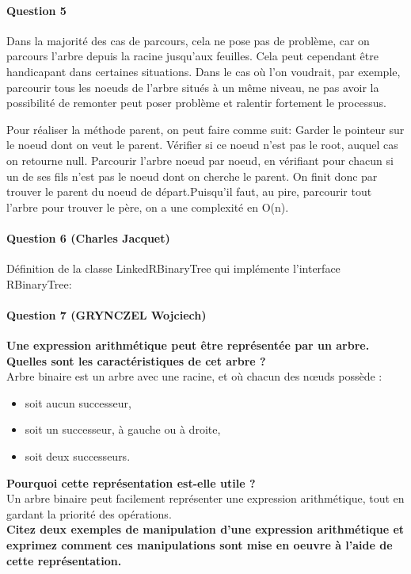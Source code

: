 \documentclass[a4paper]{article}
\begin{document}
\paragraph{Question 5}

Dans la majorité des cas de parcours, cela ne pose pas de problème, car on parcours l'arbre depuis la racine jusqu'aux feuilles. Cela peut cependant être handicapant dans certaines situations. Dans le cas où l'on voudrait, par exemple, parcourir tous les noeuds de l'arbre situés à un même niveau, ne pas avoir la possibilité de remonter peut poser problème et ralentir fortement le processus.

Pour réaliser la méthode parent, on peut faire comme suit: Garder le pointeur sur le noeud dont on veut le parent.
Vérifier si ce noeud n'est pas le root, auquel cas on retourne null.
Parcourir l'arbre noeud par noeud, en vérifiant pour chacun si un de ses fils n'est pas le noeud dont on cherche le parent. 
On finit donc par trouver le parent du noeud de départ.Puisqu'il faut, au pire, parcourir tout l'arbre pour trouver le père, on a une complexité en O(n).

\paragraph{Question 6 (Charles Jacquet)}


Définition de la classe LinkedRBinaryTree qui implémente l'interface RBinaryTree:



\paragraph{Question 7 (GRYNCZEL Wojciech)}	
\textbf{
	Une expression arithmétique peut être représentée par un arbre.
	Quelles sont les caractéristiques de cet arbre ?\\}
Arbre binaire est un arbre avec une racine, et où chacun des nœuds possède : 
\begin{itemize}
	\item soit aucun successeur, 
	\item soit un successeur, à gauche ou à droite, 
	\item soit deux successeurs. 
\end{itemize}


\textbf{Pourquoi cette représentation est-elle utile ?}\\
Un arbre binaire peut facilement représenter une expression arithmétique, tout en gardant la priorité des opérations.\\
\textbf{Citez deux exemples de manipulation d’une expression arithmétique et exprimez comment ces manipulations sont mise en oeuvre à l’aide de cette représentation.}
\end{document}
